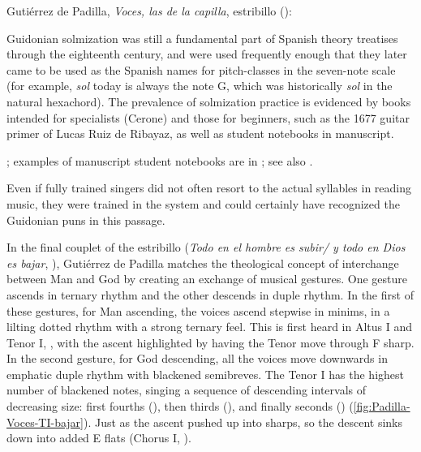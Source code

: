 \begin{musicexample}
    \caption{Gutiérrez de Padilla, \emph{Voces, las de la capilla}, estribillo
    (): }
  
    \label{music:Padilla-Voces-alamire}
\end{musicexample}

Guidonian solmization was still a fundamental part of Spanish theory treatises
through the eighteenth century, and were used frequently enough that they later
came to be used as the Spanish names for pitch-classes in the seven-note scale
(for example, \emph{sol} today is always the note G, which was historically
\emph{sol} in the natural hexachord).
The prevalence of solmization practice is evidenced by books intended for
specialists (Cerone) and those for beginners, such as the 1677 guitar primer of
Lucas Ruiz de Ribayaz, as well as student notebooks in manuscript.%
\begin{Footnote}
    \Autocite{Ruiz:Luz}; examples of manuscript student notebooks are in
    ; see also \autocite{Cohen:NotesMiddleAges}.
\end{Footnote}
Even if fully trained singers did not often resort to the actual syllables in
reading music, they were trained in the system and could certainly have
recognized the Guidonian puns in this passage.

In the final couplet of the estribillo (\emph{Todo en el hombre es subir/ y todo
en Dios es bajar}, ), Gutiérrez de Padilla matches the
theological concept of interchange between Man and God by creating an exchange
of musical gestures.
One gesture ascends in ternary rhythm and the other descends in duple rhythm.
In the first of these gestures, for Man ascending, the voices ascend stepwise in
minims, in a lilting dotted rhythm with a strong ternary feel.
This is first heard in Altus I and Tenor I, , with the ascent
highlighted by having the Tenor move through F sharp.
In the second gesture, for God descending, all the voices move downwards in
emphatic duple rhythm with blackened semibreves.
The Tenor I has the highest number of blackened notes, singing a sequence of
descending intervals of decreasing size: first fourths (),
then thirds (), and finally seconds ()
(\cref{fig:Padilla-Voces-TI-bajar}).
Just as the ascent pushed up into sharps, so the descent sinks down into added E
flats (Chorus I, ).

